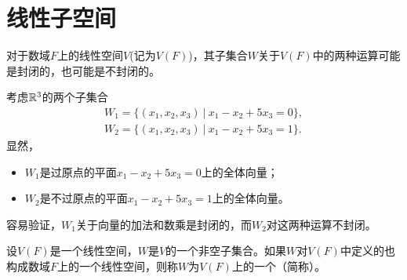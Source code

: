 \section{线性子空间}
\begin{frame}
对于数域$F$上的线性空间$V$(记为$V(F)$)，其子集合$W$关于$V(F)$中的两种运算可能是封闭的，也可能是不封闭的。
\end{frame}

\begin{frame}
考虑$\mathbb R^3$的两个子集合
$$
\begin{array}{l}
  W_1=\{(x_1,x_2,x_3)~|~x_1-x_2+5x_3=0\},\\
  W_2=\{(x_1,x_2,x_3)~|~x_1-x_2+5x_3=1\}.
\end{array}
$$
显然，
\begin{itemize}
\item $W_1$是过原点的平面$x_1-x_2+5x_3=0$上的全体向量；
\item $W_2$是不过原点的平面$x_1-x_2+5x_3=1$上的全体向量。
\end{itemize}\pause 

容易验证，$W_1$关于向量的加法和数乘是封闭的，而$W_2$对这两种运算不封闭。
\end{frame}

\begin{frame}
  \begin{dingyi}[线性子空间]
    设$V(F)$是一个线性空间，$W$是$V$的一个非空子集合。如果$W$对$V(F)$中定义的也构成数域$F$上的一个线性空间，则称$W$为$V(F)$上的一个（简称）。
  \end{dingyi}
\end{frame}

